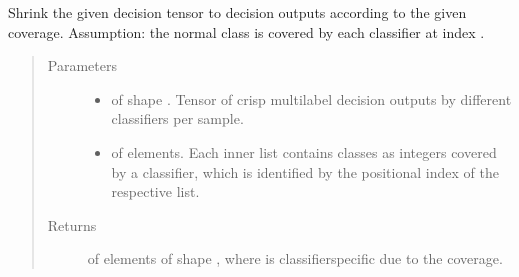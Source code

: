 \documentclass[letterpaper,10pt,english]{sphinxmanual}
\begin{document}

\begin{fulllineitems}
\label{\detokenize{pusion.util.generator:pusion.util.generator.shrink_to_coverage}}
\sphinxAtStartPar
Shrink the given decision tensor to decision outputs according to the given coverage.
Assumption: the normal class is covered by each classifier at index .
\begin{quote}\begin{description}
\item[{Parameters}] \leavevmode\begin{itemize}
\item {} 
\sphinxAtStartPar
{} \textendash{}  of shape .
Tensor of crisp multilabel decision outputs by different classifiers per sample.

\item {} 
\sphinxAtStartPar
{} \textendash{}  of  elements. Each inner list contains classes as integers covered by a classifier,
which is identified by the positional index of the respective list.

\end{itemize}

\item[{Returns}] \leavevmode
\sphinxAtStartPar
{} of  elements of shape , where  is
classifier\sphinxhyphen{}specific due to the coverage.

\end{description}\end{quote}

\end{fulllineitems}

\end{document}
